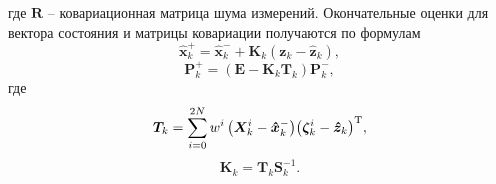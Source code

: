 где $\bm R$ -- ковариационная матрица шума измерений. Окончательные оценки для вектора состояния и матрицы ковариации получаются по формулам
\begin{equation}
{\bm{\hat x}}_k^ +  = {\bm{\hat x}}_k^ -  + {{\bm{K}}_k}({{\bm{z}}_k} - {{{\bm{\hat z}}}_k}),
\end{equation}
\begin{equation}
{\bm{P}}_k^ +  = \left( {{\bm{E}} - {{\bm{K}}_k}{{\bm{T}}_k}} \right){\bm{P}}_k^ - ,
\end{equation}
где
\begin{equation}
{{\bm{T}}_k} = \sum\limits_{i = 0}^{2N} {{w^i}\left( {{\bm{X}}_k^i - {\bm{\hat x}}_k^ - } \right)} {\left( {{\bm{\zeta }}_k^i - {{{\bm{\hat z}}}_k}} \right)^{\rm{T}}},
\end{equation}
\begin{equation}
{{\bm{K}}_k} = {{\bm{T}}_k}{\bm{S}}_k^{ - 1}.
\end{equation}
